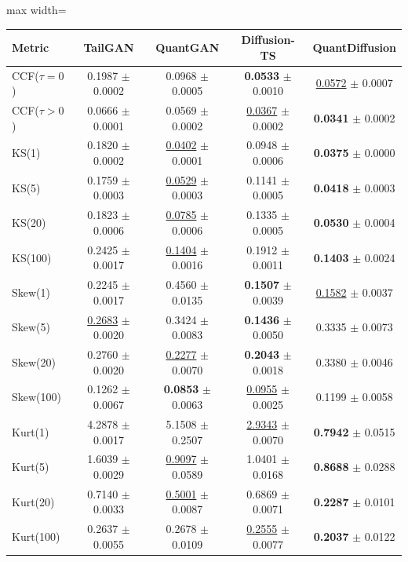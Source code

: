 \documentclass[sigconf,natbib=false]{acmart}
\begin{document}
\begin{table}[htbp]
\begin{adjustbox}{max width=\textwidth}
\begin{tabular}{l|cccc}
\toprule
\textbf{Metric} & \textbf{TailGAN} & \textbf{QuantGAN} & \textbf{Diffusion-TS} & \textbf{QuantDiffusion} \\
\midrule
CCF($\tau = 0$)
& 0.1987 $\pm$ 0.0002
& 0.0968 $\pm$ 0.0005
& \textbf{0.0533} $\pm$ 0.0010
& \underline{0.0572} $\pm$ 0.0007 \\
CCF($\tau > 0$)
& 0.0666 $\pm$ 0.0001
& 0.0569 $\pm$ 0.0002
& \underline{0.0367} $\pm$ 0.0002
& \textbf{0.0341} $\pm$ 0.0002 \\
\midrule
KS(1)
& 0.1820 $\pm$ 0.0002
& \underline{0.0402} $\pm$ 0.0001
& 0.0948 $\pm$ 0.0006
& \textbf{0.0375} $\pm$ 0.0000 \\
KS(5)
& 0.1759 $\pm$ 0.0003
& \underline{0.0529} $\pm$ 0.0003
& 0.1141 $\pm$ 0.0005
& \textbf{0.0418} $\pm$ 0.0003 \\
KS(20)
& 0.1823 $\pm$ 0.0006
& \underline{0.0785} $\pm$ 0.0006
& 0.1335 $\pm$ 0.0005
& \textbf{0.0530} $\pm$ 0.0004 \\
KS(100)
& 0.2425 $\pm$ 0.0017
& \underline{0.1404} $\pm$ 0.0016
& 0.1912 $\pm$ 0.0011
& \textbf{0.1403} $\pm$ 0.0024 \\
\midrule
Skew(1)
& 0.2245 $\pm$ 0.0017
& 0.4560 $\pm$ 0.0135
& \textbf{0.1507} $\pm$ 0.0039
& \underline{0.1582} $\pm$ 0.0037 \\
Skew(5)
& \underline{0.2683} $\pm$ 0.0020
& 0.3424 $\pm$ 0.0083
& \textbf{0.1436} $\pm$ 0.0050
& 0.3335 $\pm$ 0.0073 \\
Skew(20)
& 0.2760 $\pm$ 0.0020
& \underline{0.2277} $\pm$ 0.0070
& \textbf{0.2043} $\pm$ 0.0018
& 0.3380 $\pm$ 0.0046 \\
Skew(100)
& 0.1262 $\pm$ 0.0067
& \textbf{0.0853} $\pm$ 0.0063
& \underline{0.0955} $\pm$ 0.0025
& 0.1199 $\pm$ 0.0058 \\
\midrule
Kurt(1)
& 4.2878 $\pm$ 0.0017
& 5.1508 $\pm$ 0.2507
& \underline{2.9343} $\pm$ 0.0070
& \textbf{0.7942} $\pm$ 0.0515 \\
Kurt(5)
& 1.6039 $\pm$ 0.0029
& \underline{0.9097} $\pm$ 0.0589
& 1.0401 $\pm$ 0.0168
& \textbf{0.8688} $\pm$ 0.0288 \\
Kurt(20)
& 0.7140 $\pm$ 0.0033
& \underline{0.5001} $\pm$ 0.0087
& 0.6869 $\pm$ 0.0071
& \textbf{0.2287} $\pm$ 0.0101 \\
Kurt(100)
& 0.2637 $\pm$ 0.0055
& 0.2678 $\pm$ 0.0109
& \underline{0.2555} $\pm$ 0.0077
& \textbf{0.2037} $\pm$ 0.0122 \\
\midrule

\end{tabular}
\end{adjustbox}
\end{table}
\end{document}
